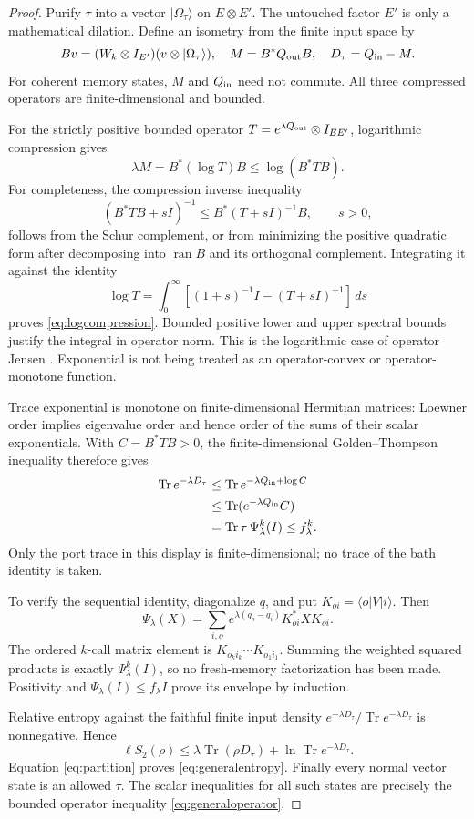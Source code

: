 \documentclass[11pt]{article}
\newcommand{\Tr}{\operatorname{Tr}}
\newcommand{\ket}[1]{\lvert #1\rangle}
\newcommand{\bra}[1]{\langle #1\rvert}
\begin{document}
\begin{proof}
Purify \(\tau\) into a vector \(\ket{\Omega_\tau}\) on \(E\otimes E'\).
The untouched factor \(E'\) is only a mathematical dilation. Define an
isometry from the finite input space by
\[
 Bv=(W_k\otimes I_{E'})(v\otimes\ket{\Omega_\tau}),\quad
 M=B^*Q_{\rm out}B,\quad D_\tau=Q_{\rm in}-M.
\]
For coherent memory states, \(M\) and \(Q_{\rm in}\) need not commute.
All three compressed operators are finite-dimensional and bounded.

For the strictly positive bounded operator
\(T=e^{\lambda Q_{\rm out}}\otimes I_{EE'}\), logarithmic compression gives
\begin{equation}\label{eq:logcompression}
 \lambda M=B^*(\log T)B\le\log(B^*TB).
\end{equation}
For completeness, the compression inverse inequality
\[
 (B^*TB+sI)^{-1}\le B^*(T+sI)^{-1}B,\qquad s>0,
\]
follows from the Schur complement, or from minimizing the positive
quadratic form after decomposing into \(\operatorname{ran}B\) and its
orthogonal complement. Integrating it against the identity
\[
 \log T=\int_0^\infty
 [(1+s)^{-1}I-(T+sI)^{-1}]\,ds
\]
proves \eqref{eq:logcompression}. Bounded positive lower and upper spectral
bounds justify the integral in operator norm. This is the logarithmic
case of operator Jensen \cite{HP}. Exponential is not being treated as
an operator-convex or operator-monotone function.

Trace exponential is monotone on finite-dimensional Hermitian matrices:
Loewner order implies eigenvalue order and hence order of the sums of
their scalar exponentials. With \(C=B^*TB>0\), the finite-dimensional
Golden--Thompson inequality \cite{Golden,Thompson} therefore gives
\begin{align}
 \Tr e^{-\lambda D_\tau}
 &\le\Tr e^{-\lambda Q_{\rm in}+\log C}\notag\\
 &\le\Tr(e^{-\lambda Q_{\rm in}}C)\notag\\
 &=\Tr\tau\,\Psi_\lambda^k(I)
 \le f_\lambda^k. \label{eq:partition}
\end{align}
Only the port trace in this display is finite-dimensional; no trace of
the bath identity is taken.

To verify the sequential identity, diagonalize \(q\), and put
\(K_{oi}=\bra oV\ket i\). Then
\[
 \Psi_\lambda(X)=
 \sum_{i,o}e^{\lambda(q_o-q_i)}K_{oi}^*XK_{oi}.
\]
The ordered \(k\)-call matrix element is
\(K_{o_ki_k}\cdots K_{o_1i_1}\). Summing the weighted squared products
is exactly \(\Psi_\lambda^k(I)\), so no fresh-memory factorization has
been made. Positivity and \(\Psi_\lambda(I)\le f_\lambda I\) prove its
envelope by induction.

Relative entropy against the faithful finite input density
\(e^{-\lambda D_\tau}/\Tr e^{-\lambda D_\tau}\) is nonnegative. Hence
\[
 \ell S_2(\rho)\le
 \lambda\Tr(\rho D_\tau)+\ln\Tr e^{-\lambda D_\tau}.
\]
Equation \eqref{eq:partition} proves \eqref{eq:generalentropy}.
Finally every normal vector state is an allowed \(\tau\).
The scalar inequalities for all such states are precisely the bounded
operator inequality \eqref{eq:generaloperator}.
\end{proof}
\end{document}
